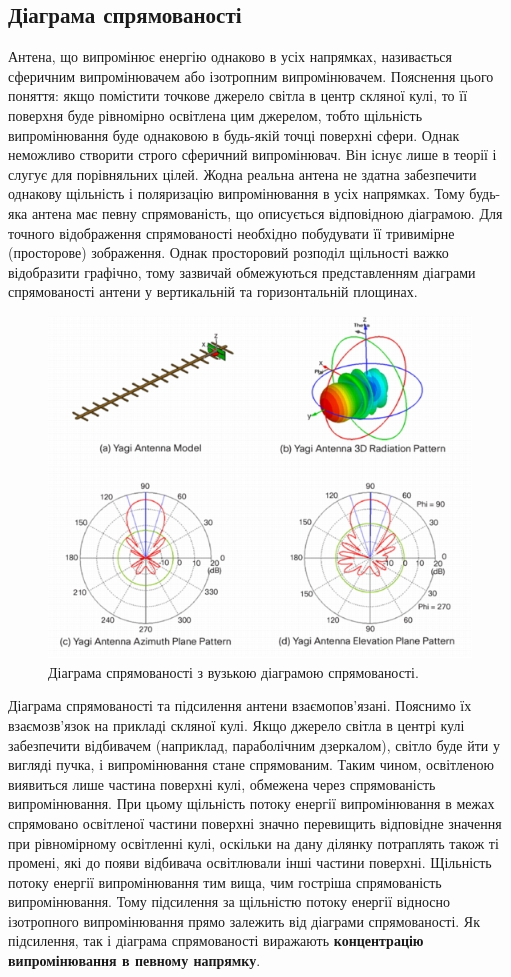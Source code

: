\documentclass{article}
\begin{document}
\subsection{Діаграма спрямованості}
Антена, що випромінює енергію однаково в усіх напрямках, називається сферичним випромінювачем або ізотропним випромінювачем. Пояснення цього поняття: якщо помістити точкове джерело світла в центр скляної кулі, то її поверхня буде рівномірно освітлена цим джерелом, тобто щільність випромінювання буде однаковою в будь-якій точці поверхні сфери. Однак неможливо створити строго сферичний випромінювач. Він існує лише в теорії і слугує для порівняльних цілей. Жодна реальна антена не здатна забезпечити однакову щільність і поляризацію випромінювання в усіх напрямках. Тому будь-яка антена має певну спрямованість, що описується відповідною діаграмою. Для точного відображення спрямованості необхідно побудувати її тривимірне (просторове) зображення. Однак просторовий розподіл щільності важко відобразити графічно, тому зазвичай обмежуються представленням діаграми спрямованості антени у вертикальній та горизонтальній площинах.

\begin{figure}[H]
\centering
\includegraphics[width=0.6\linewidth]{images/yagi-antenna.jpg}
\caption{\label{fig:yagi:antenna}Діаграма спрямованості з вузькою діаграмою спрямованості.}
\end{figure}

Діаграма спрямованості та підсилення антени взаємопов'язані. Пояснимо їх взаємозв'язок на прикладі скляної кулі. Якщо джерело світла в центрі кулі забезпечити відбивачем (наприклад, параболічним дзеркалом), світло буде йти у вигляді пучка, і випромінювання стане спрямованим. Таким чином, освітленою виявиться лише частина поверхні кулі, обмежена через спрямованість випромінювання. При цьому щільність потоку енергії випромінювання в межах спрямовано освітленої частини поверхні значно перевищить відповідне значення при рівномірному освітленні кулі, оскільки на дану ділянку потраплять також ті промені, які до появи відбивача освітлювали інші частини поверхні. Щільність потоку енергії випромінювання тим вища, чим гостріша спрямованість випромінювання. Тому підсилення за щільністю потоку енергії відносно ізотропного випромінювання прямо залежить від діаграми спрямованості. Як підсилення, так і діаграма спрямованості виражають \textbf{концентрацію випромінювання в певному напрямку}.
\end{document}

